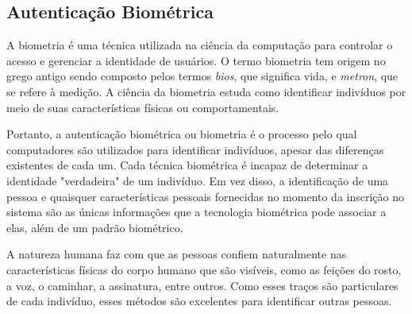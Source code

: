 \subsection{Autenticação Biométrica}
\label{subsec:autenticacao-biometrica}

A biometria é uma técnica utilizada na ciência da computação para controlar o
acesso e gerenciar a identidade de usuários.
O termo biometria tem origem no grego antigo sendo composto pelos termos \textit{bios},
que significa vida, e \textit{metron}, que se refere à medição.
A ciência da biometria estuda como identificar indivíduos por meio de suas
características físicas ou comportamentais\cite{idrus2013}.

Portanto, a autenticação biométrica ou biometria é o processo pelo qual
computadores
são utilizados para identificar indivíduos, apesar das diferenças existentes
de cada um.
Cada técnica biométrica é incapaz de determinar a identidade "verdadeira" de um
indivíduo.
Em vez disso, a identificação de uma pessoa e quaisquer características pessoais
fornecidas no momento da inscrição no sistema são as únicas informações que a
tecnologia biométrica pode associar a elas, além de um padrão biométrico\cite{wayman2005}.

A natureza humana faz com que as pessoas confiem naturalmente nas características
físicas do corpo humano que são visíveis, como as feições do rosto, a voz, o
caminhar,
a assinatura, entre outros.
Como esses traços são particulares de cada indivíduo, esses métodos são
excelentes para identificar outras pessoas\cite{alsaadi2015}.

